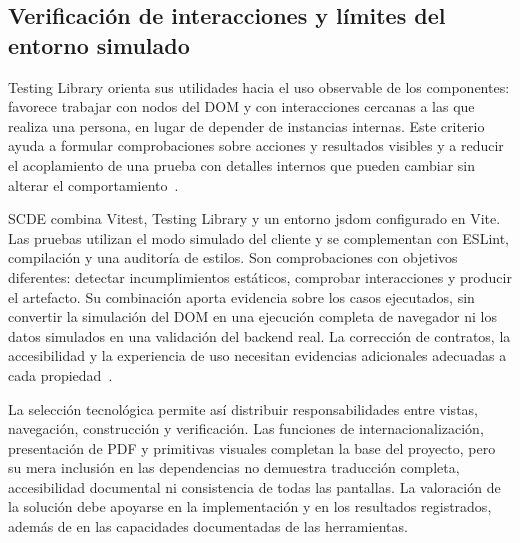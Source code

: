 \subsection{Verificación de interacciones y límites del entorno simulado}

Testing Library orienta sus utilidades hacia el uso observable de los componentes:
favorece trabajar con nodos del DOM y con interacciones cercanas a las que realiza
una persona, en lugar de depender de instancias internas. Este criterio ayuda a
formular comprobaciones sobre acciones y resultados visibles y a reducir el
acoplamiento de una prueba con detalles internos que pueden cambiar sin alterar
el comportamiento~\cite{codex_testing_principles}.

SCDE combina Vitest, Testing Library y un entorno jsdom configurado en Vite. Las
pruebas utilizan el modo simulado del cliente y se complementan con ESLint,
compilación y una auditoría de estilos. Son comprobaciones con objetivos
diferentes: detectar incumplimientos estáticos, comprobar interacciones y producir
el artefacto. Su combinación aporta evidencia sobre los casos ejecutados, sin
convertir la simulación del DOM en una ejecución completa de navegador ni los
datos simulados en una validación del backend real.
La corrección de contratos, la accesibilidad y la experiencia de uso necesitan
evidencias adicionales adecuadas a cada propiedad~\cite{codex_scde_frontend_architecture}.

La selección tecnológica permite así distribuir responsabilidades entre vistas,
navegación, construcción y verificación. Las funciones de internacionalización,
presentación de PDF y primitivas visuales completan la base del proyecto, pero
su mera inclusión en las dependencias no demuestra traducción completa,
accesibilidad documental ni consistencia de todas las pantallas. La valoración
de la solución debe apoyarse en la implementación y en los resultados registrados,
además de en las capacidades documentadas de las herramientas.
